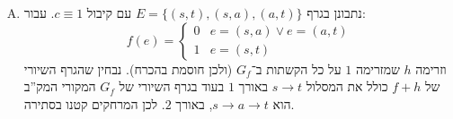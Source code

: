 \documentclass[]{article}
\begin{document}
\begin{enumerate}[(A)]
		\item נתבונן בגרף $E = \{(s, t), (s, a), (a, t)\}$ עם קיבול $c \equiv 1$. עבור: 
		\[ f(e) = \begin{cases}
			0 & e = (s, a) \lor e = (a, t) \\
			1 & e = (s, t)
		\end{cases} \]
		וזרימה $h$ שמזרימה $1$ על כל הקשתות ב־$G_f$ (ולכן חוסמת בהכרח). נבחין שהגרף השיורי של $f + h$ כולל את המסלול $s \to t$ באורך $1$ בעוד בגרף השיורי של $G_f$ המקורי המק''ב הוא $s \to a \to t$, באורך $2$. לכן המרחקים קטנו בסתירה. 
	\end{enumerate}
	
\end{document}
